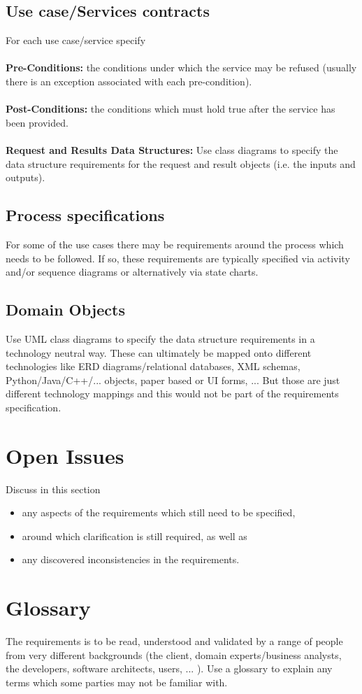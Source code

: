 \documentclass[11pt,a4paper]{article}
\begin{document}
\subsection{Use case/Services contracts}
For each use case/service specify
\\\\
\textbf{Pre-Conditions: }the conditions under which the service may be refused (usually there is an exception associated with each pre-condition).
\\\\
\textbf{Post-Conditions: }the conditions which must hold true after the service has been provided.
\\\\
\textbf{Request and Results Data Structures: }Use class diagrams to specify the data structure requirements for the request and result objects (i.e. the inputs and outputs).
\subsection{Process specifications}
For some of the use cases there may be requirements around the process which needs to be followed. If so, these requirements are typically specified via activity and/or sequence diagrams or
alternatively via state charts.
\subsection{Domain Objects}
Use UML class diagrams to specify the data structure requirements in a technology neutral way. These can ultimately be mapped onto different technologies like ERD diagrams/relational databases, XML schemas, Python/Java/C++/... objects, paper based or UI forms, ... But those are just different technology mappings and this would not be part of the requirements specification.
\section{Open Issues}
Discuss in this section
\begin{itemize}
	\item any aspects of the requirements which still need to be specified,
	\item around which clarification is still required, as well as
	\item any discovered inconsistencies in the requirements.
\end{itemize}
\section{Glossary}
The requirements is to be read, understood and validated by a range of people from very different backgrounds (the client, domain experts/business analysts, the developers, software architects, users, ... ). Use a glossary to explain any terms which some parties may not be familiar with.
	
\end{document}
